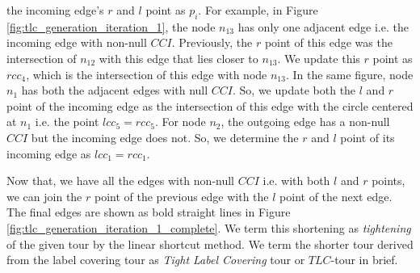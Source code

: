 \documentclass{llncs}
\begin{document}
\begin{enumerate}
  the incoming edge's $r$ and $l$ point as $p_i$. For example, in Figure
  \ref{fig:tlc_generation_iteration_1}, the node $n_{13}$ has only one adjacent edge i.e. the
  incoming edge with non-null $CCI$. Previously, the $r$ point of this edge was the intersection of
  $n_{12}$ with this edge that lies closer to $n_{13}$. We update this $r$ point as $rcc_4$, which
  is the intersection of this edge with node $n_{13}$. In the same figure, node $n_1$ has both the
  adjacent edges with null $CCI$. So, we update both the $l$ and $r$ point of the incoming edge as
  the intersection of this edge with the circle centered at $n_1$ i.e. the point $lcc_5=rcc_5$. For
  node $n_2$, the outgoing edge has a non-null $CCI$ but the incoming edge does not. So, we
  determine the $r$ and $l$ point of its incoming edge as $lcc_1=rcc_1$.
\end{enumerate} 
Now that, we have all the edges with non-null $CCI$ i.e. with both $l$ and $r$ points, we can join
the $r$ point of the previous edge with the $l$ point of the next edge. The final edges are shown as
bold straight lines in Figure \ref{fig:tlc_generation_iteration_1_complete}.  We term 
this shortening as \textit{tightening} of the given tour by the
linear shortcut method. We term the shorter tour derived from the label covering tour as
\textit{Tight Label Covering} tour or $TLC$-tour in brief.
\end{document}

